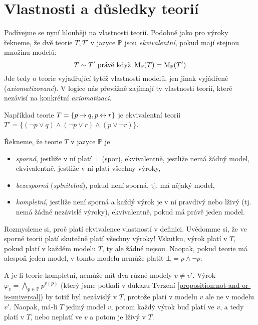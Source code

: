 \section{Vlastnosti a důsledky teorií}

Podívejme se nyní hlouběji na vlastnosti teorií. Podobně jako pro výroky řekneme, že dvě teorie $T,T'$ v jazyce $\mathbb P$ jsou \emph{ekvivalentní}, pokud mají stejnou množinu modelů:
$$
T\sim T' \text{ právě když } \operatorname{M}_\mathbb P(T)=\operatorname{M}_\mathbb P(T')
$$
Jde tedy o teorie vyjadřující tytéž vlastnosti modelů, jen jinak vyjádřené (\emph{axiomatizované}). V logice nás převážně zajímají ty vlastnosti teorií, které nezávisí na konkrétní \emph{axiomatizaci}.

\begin{example}
    Například teorie $T=\{p\mathbin{\rightarrow} q,p\mathbin{\leftrightarrow} r\}$ je ekvivalentní teorii $T'=\{(\neg p\lor q)\land(\neg p\lor r)\land(p\lor\neg r)\}$.
\end{example}

\begin{definition}
Řekneme, že teorie $T$ v jazyce $\mathbb P$ je
\begin{itemize}
    \item \emph{sporná}, jestliže v ní platí $\bot$ (spor), ekvivalentně, jestliže nemá žádný model, ekvivalentně, jestliže v ní platí všechny výroky,
    \item \emph{bezesporná} (\emph{splnitelná}), pokud není sporná, tj. má nějaký model,
    \item \emph{kompletní}, jestliže není sporná a každý výrok je v ní pravdivý nebo lživý (tj. nemá žádné nezávislé výroky), ekvivalentně, pokud má právě jeden model.
\end{itemize}
\end{definition}

Rozmysleme si, proč platí ekvivalence vlastností v definici. Uvědomme si, že ve sporné teorii platí skutečně platí všechny výroky! Vskutku, výrok platí v $T$, pokud platí v každém modelu $T$, ty ale žádné nejsou. Naopak, pokud teorie má alespoň jeden model, v tomto modelu nemůže platit $\bot=p\land\neg p$.

A je-li teorie kompletní, nemůže mít dva různé modely $v\neq v'$. Výrok $\varphi_{v}=\bigwedge_{p\in\mathbb P}p^{v(p)}$ (který jsme potkali v důkazu Tvrzení \ref{proposition:not-and-or-is-universal}) by totiž byl nezávislý v $T$, protože platí v modelu $v$ ale ne v modelu $v'$. Naopak, má-li $T$ jediný model $v$, potom každý výrok buď platí ve $v$, a tedy platí v $T$, nebo neplatí ve $v$ a potom je lživý v $T$.

